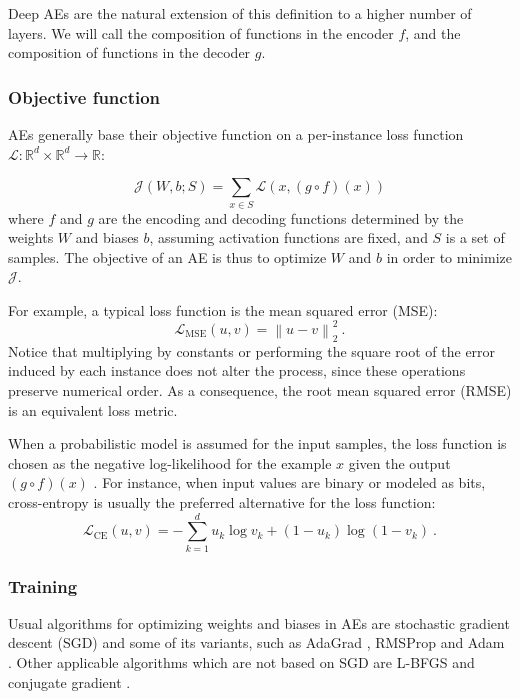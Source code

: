 Deep AEs are the natural extension of this definition to a higher number of layers. We will call the composition of functions in the encoder $f$, and the composition of functions in the decoder $g$.

\subsubsection{Objective function}

AEs generally base their objective function on a per-instance loss function $\mathcal L:\mathbb R^d\times \mathbb R^d\rightarrow \mathbb R$:

\begin{equation}
\mathcal J(W,b;S)= \sum_{x \in S} \mathcal L(x, (g\circ f)(x))
\end{equation}
where $f$ and $g$ are the encoding and decoding functions determined by the weights $W$ and biases $b$, assuming activation functions are fixed, and $S$ is a set of samples. The objective of an AE is thus to optimize $W$ and $b$ in order to minimize $\mathcal J$.

For example, a typical loss function is the mean squared error (MSE):
\begin{equation}
\mathcal L_{\mathrm{MSE}}(u, v)=\left\lVert u - v\right\rVert_2^2~.
\end{equation}
Notice that multiplying by constants or performing the square root of the error induced by each instance does not alter the process, since these operations preserve numerical order. As a consequence, the root mean squared error (RMSE) is an equivalent loss metric.

When a probabilistic model is assumed for the input samples, the loss function is chosen as the negative log-likelihood for the example $x$ given the output $(g\circ f)(x)$ . For instance, when input values are binary or modeled as bits, cross-entropy is usually the preferred alternative for the loss function:
\begin{equation}
  \mathcal L_{\mathrm{CE}}(u, v)=-\sum_{k=1}^d u_k \log v_k + (1 - u_k)\log(1 - v_k)~.
\end{equation}

\subsubsection{Training}\label{p1Sec.Training}

Usual algorithms for optimizing weights and biases in AEs are stochastic gradient descent (SGD)  and some of its variants, such as AdaGrad , RMSProp  and Adam . Other applicable algorithms which are not based on SGD are L-BFGS and conjugate gradient .

